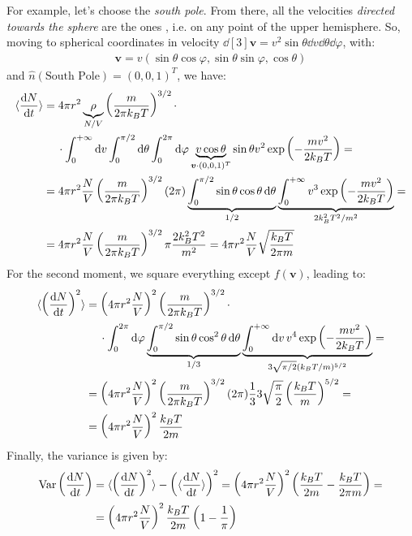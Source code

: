 \documentclass[../template.tex]{subfiles}
\begin{document}
\begin{exo}
    For example, let's choose the \textit{south pole}. From there, all the velocities \textit{directed towards the sphere} are the ones , i.e. on any point of the upper hemisphere. So, moving to spherical coordinates in velocity $\dd[3]{\bm{v}} = v^2 \sin \theta \dd{v} \dd{\theta} \dd{\varphi}$, with:
    \begin{align*}
        \bm{v} = v (\sin\theta \cos \varphi, \sin \theta \sin \varphi, \cos \theta)
    \end{align*}
    and $\hat{n}(\text{South Pole}) = (0,0,1)^T$, we have:
    \begin{align*}
        \langle \dv{N}{t}  \rangle &= 4 \pi r^2 \underbrace{\rho}_{N/V} \left(\frac{m}{2 \pi k_B T} \right)^{3/2} \cdot \\
        &\quad \> \cdot \int_0^{+\infty} \dd{v} \int_0^{\pi/2} \dd{\theta} \int_0^{2 \pi} \dd{\varphi} \underbrace{v \cos \theta}_{\bm{v} \cdot (0,0,1)^T}  \sin \theta v^2 \exp\left(-\frac{mv^2}{2 k_B T} \right) =\\
        &= 4 \pi r^2 \frac{N}{V} \left(\frac{m}{2 \pi k_B T} \right)^{3/2} (2 \pi) \underbrace{\int_0^{\pi/2} \sin \theta \cos \theta \dd{\theta}}_{1/2} \underbrace{\int_0^{+\infty} v^3 \exp\left(-\frac{mv^2}{2k_B T} \right)}_{2k_B^2 T^2 / m^2} =\\
        &= 4 \pi r^2 \frac{N}{V} \left(\frac{m}{2\pi k_B T} \right)^{3/2} \pi \frac{2 k_B^2 T^2}{m^2} = 4 \pi r^2 \frac{N}{V} \sqrt{\frac{k_B T}{2 \pi m}}
    \end{align*}
    For the second moment, we square everything except $f(\bm{v})$, leading to:
    \begin{align*}
        \langle \left(\dv{N}{t}\right)^2  \rangle &= \left(4 \pi r^2 \frac{N}{V} \right)^2 \left(\frac{m}{2 \pi k_B T} \right)^{3/2} \cdot\\
        &\quad\>\cdot \int_0^{2\pi} \dd{\varphi} \underbrace{\int_0^{\pi/2} \sin \theta \cos^2 \theta \dd{\theta}}_{1/3} \underbrace{\int_{0}^{+\infty} \dd{v} v^4 \exp\left(-\frac{mv^2}{2k_BT} \right)}_{3\sqrt{\pi/2} (k_B T/m)^{5/2}} =\\
        &= \left(4 \pi r^2 \frac{N}{V} \right)^2 \left(\frac{m}{2 \pi k_B T} \right)^{3/2} (2\pi) \frac{1}{3} 3 \sqrt{\frac{\pi}{2} } \left(\frac{k_B T}{m} \right)^{5/2} = \\
        &= \left(4 \pi r^2 \frac{N}{V} \right)^2 \frac{k_B T}{2m} 
    \end{align*}
    Finally, the variance is given by:
    \begin{align*}
        \operatorname{Var} \left(\dv{N}{t}\right) &= \langle \left(\dv{N}{t}\right)^2  \rangle - \left(\langle \dv{N}{t}  \rangle\right)^2 = \left(4 \pi r^2 \frac{N}{V} \right)^2 \left(\frac{k_B T}{2m} - \frac{k_B T}{2 \pi m}  \right) =\\
        &= \left(4 \pi r^2 \frac{N}{V} \right)^2\frac{k_B T}{2m}\left(1-\frac{1}{\pi} \right) 
    \end{align*}
\end{exo}
\end{document}
